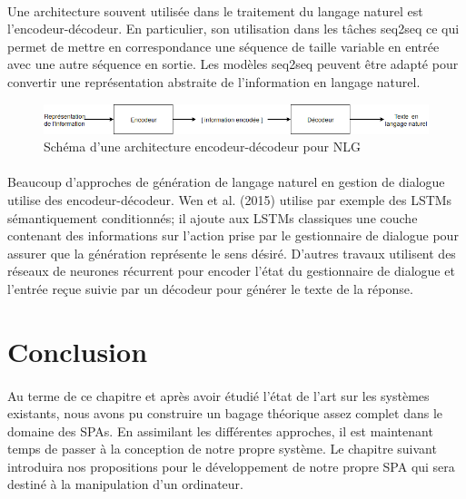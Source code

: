 \paragraph{}
Une architecture souvent utilisée dans le traitement du langage naturel est l’encodeur-décodeur. En particulier, son utilisation dans les tâches seq2seq ce qui permet de mettre en correspondance une séquence de taille variable en entrée avec une autre séquence en sortie. Les modèles seq2seq peuvent être adapté pour convertir une représentation abstraite de l’information en langage naturel\cite{Ferreira2017}.\newline
\begin{figure}[H]
	\centering
	\includegraphics[width=.95\linewidth]{images/NLG/Encoder.png} 
	\caption{Schéma d'une architecture encodeur-décodeur pour NLG} 
\end{figure}
\paragraph{}
Beaucoup d’approches de génération de langage naturel en gestion de dialogue utilise des encodeur-décodeur. Wen et al. (2015)\cite{Wen2015} utilise par exemple des LSTMs sémantiquement conditionnés; il ajoute aux LSTMs classiques une couche contenant des informations sur l’action prise par le gestionnaire de dialogue pour assurer que la génération représente le sens désiré. D’autres travaux utilisent des réseaux de neurones récurrent pour encoder l’état du gestionnaire de dialogue et l’entrée reçue suivie par un décodeur pour générer le texte de la réponse\cite{Sordoni2015,Serban2016,Goyal2016}.
\section{Conclusion}
\paragraph{}
Au terme de ce chapitre et après avoir étudié l'état de l'art sur les systèmes existants, nous avons pu construire un bagage théorique assez complet dans le domaine des SPAs. En assimilant les différentes approches, il est maintenant temps de passer à la conception de notre propre système. Le chapitre suivant introduira nos propositions pour le développement de notre propre SPA qui sera destiné à la manipulation d'un ordinateur.